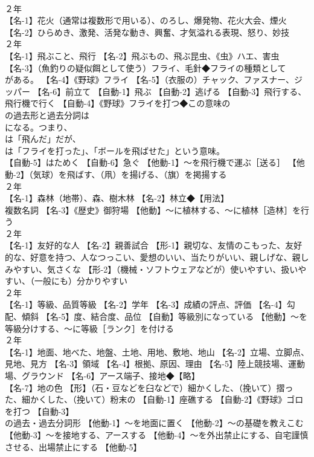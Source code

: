 \documentclass[8pt]{extreport}
\begin{document}
\begin{CJK}{UTF8}{min}
\\	２年	
\\	【名-1】花火（通常は複数形で用いる）、のろし、爆発物、花火大会、煙火 【名-2】ひらめき、激発、活発な動き、興奮、才気溢れる表現、怒り、妙技
\\	２年	
\\	【名-1】飛ぶこと、飛行 【名-2】飛ぶもの、飛ぶ昆虫、《虫》ハエ、害虫 【名-3】（魚釣りの疑似餌として使う）フライ、毛針◆フライの種類として 
\\	がある。 【名-4】《野球》フライ 【名-5】（衣服の）チャック、ファスナー、ジッパー 【名-6】前立て 【自動-1】飛ぶ 【自動-2】逃げる 【自動-3】飛行する、飛行機で行く 【自動-4】《野球》フライを打つ◆この意味の 
\\	の過去形と過去分詞は 
\\	になる。つまり、
\\	は「飛んだ」だが、
\\	は「フライを打った」、「ボールを飛ばせた」という意味。
\\	【自動-5】はためく 【自動-6】急ぐ 【他動-1】～を飛行機で運ぶ［送る］ 【他動-2】（気球）を飛ばす、（凧）を揚げる、（旗）を掲揚する
\\	２年	
\\	【名-1】森林（地帯）、森、樹木林 【名-2】林立◆【用法】
\\	複数名詞 【名-3】《歴史》御狩場 【他動】～に植林する、～に植林［造林］を行う
\\	２年	
\\	【名-1】友好的な人 【名-2】親善試合 【形-1】親切な、友情のこもった、友好的な、好意を持つ、人なつっこい、愛想のいい、当たりがいい、親しげな、親しみやすい、気さくな 【形-2】（機械・ソフトウェアなどが）使いやすい、扱いやすい、（一般にも）分かりやすい
\\	２年	
\\	【名-1】等級、品質等級 【名-2】学年 【名-3】成績の評点、評価 【名-4】勾配、傾斜 【名-5】度、結合度、品位 【自動】等級別になっている 【他動】～を等級分けする、～に等級［ランク］を付ける
\\	２年	
\\	【名-1】地面、地べた、地盤、土地、用地、敷地、地山 【名-2】立場、立脚点、見地、見方 【名-3】領域 【名-4】根拠、原因、理由 【名-5】陸上競技場、運動場、グラウンド 【名-6】アース端子、接地◆【略】
\\	【名-7】地の色 【形】（石・豆などを臼などで）細かくした、（挽いて）摺った、細かくした、（挽いて）粉末の 【自動-1】座礁する 【自動-2】《野球》ゴロを打つ 【自動-3】
\\	の過去・過去分詞形 【他動-1】～を地面に置く 【他動-2】～の基礎を教えこむ 【他動-3】～を接地する、アースする 【他動-4】～を外出禁止にする、自宅謹慎させる、出場禁止にする 【他動-5】

\end{CJK}
\end{document}
